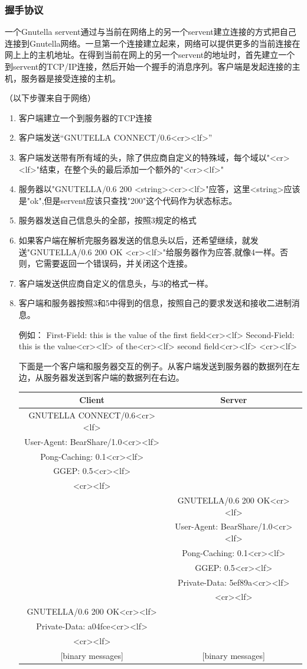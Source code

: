 \documentclass{ctexart}
\begin{document}
\subsubsection{握手协议}
一个Gnutella servent通过与当前在网络上的另一个servent建立连接的方式把自己连接到Gnutella网络。一旦第一个连接建立起来，网络可以提供更多的当前连接在网上上的主机地址。在得到当前在网上的另一个servent的地址时，首先建立一个到servent的TCP/IP连接，然后开始一个握手的消息序列。客户端是发起连接的主机，服务器是接受连接的主机。

（以下步骤来自于网络）
\begin{enumerate}
	\item 客户端建立一个到服务器的TCP连接
	\item 客户端发送“GNUTELLA CONNECT/0.6<cr><lf>”
	\item 客户端发送带有所有域的头，除了供应商自定义的特殊域，每个域以"<cr><lf>"结束，在整个头的最后添加一个额外的"<cr><lf>"
	\item 服务器以"GNUTELLA/0.6 200 <string><cr><lf>"应答，这里<string>应该是"ok",但是servent应该只查找"200"这个代码作为状态标志。
	\item 服务器发送自己信息头的全部，按照3规定的格式
	\item 如果客户端在解析完服务器发送的信息头以后，还希望继续，就发送"GNUTELLA/0.6 200 OK <cr><lf>"给服务器作为应答,就像4一样。否则，它需要返回一个错误码，并关闭这个连接。
	\item 客户端发送供应商自定义的信息头，与3的格式一样。
	\item 客户端和服务器按照3和5中得到的信息，按照自己的要求发送和接收二进制消息。
	
	例如：
	First-Field: this is the value of the first field<cr><lf>
	Second-Field: this is the value<cr><lf>
	of the<cr><lf>
	second field<cr><lf>
	<cr><lf>
	
	下面是一个客户端和服务器交互的例子。从客户端发送到服务器的数据列在左边，从服务器发送到客户端的数据列在右边。
	
	\begin{tabular}{cc}
		\hline
		Client                          &Server\\\hline
		GNUTELLA CONNECT/0.6<cr><lf>& \\
		User-Agent: BearShare/1.0<cr><lf>& \\
		Pong-Caching: 0.1<cr><lf>& \\
		GGEP: 0.5<cr><lf>& \\
		<cr><lf>& \\
		&GNUTELLA/0.6 200 OK<cr><lf> \\
		&User-Agent: BearShare/1.0<cr><lf> \\
		&Pong-Caching: 0.1<cr><lf> \\
		&GGEP: 0.5<cr><lf> \\
		&Private-Data: 5ef89a<cr><lf> \\
		&<cr><lf> \\
		GNUTELLA/0.6 200 OK<cr><lf>& \\
		Private-Data: a04fce<cr><lf>& \\
		<cr><lf>& \\
		{[binary messages]}&{[binary messages]} \\ 
	\end{tabular}
\end{enumerate}
\end{document}
